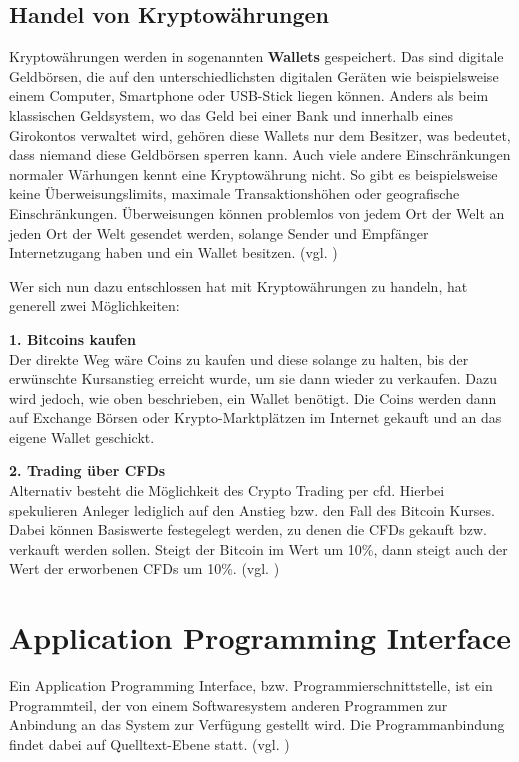 \documentclass[oneside]{ausarbeitung}
\begin{document}
\subsection{Handel von Kryptowährungen}
\label{sub:handel_von_kryptowährungen}

Kryptowährungen werden in sogenannten \textbf{Wallets} gespeichert.
Das sind digitale Geldbörsen, die auf den unterschiedlichsten
digitalen Geräten wie beispielsweise einem Computer, Smartphone oder
USB-Stick liegen können. Anders als beim klassischen Geldsystem, wo
das Geld bei einer Bank und innerhalb eines Girokontos verwaltet wird,
gehören diese Wallets nur dem Besitzer, was bedeutet, dass niemand
diese Geldbörsen sperren kann. Auch viele andere Einschränkungen
normaler Wärhungen kennt eine Kryptowährung nicht. So gibt es
beispielsweise keine Überweisungslimits, maximale Transaktionshöhen
oder geografische Einschränkungen. Überweisungen können problemlos
von jedem Ort der Welt an jeden Ort der Welt gesendet werden, solange
Sender und Empfänger Internetzugang haben und ein Wallet besitzen.
(vgl. \cite{bitcoins_erklärung})

Wer sich nun dazu entschlossen hat mit Kryptowährungen zu handeln,
hat generell zwei Möglichkeiten:

\textbf{1. Bitcoins kaufen} \\
Der direkte Weg wäre Coins zu kaufen und diese solange zu halten, bis
der erwünschte Kursanstieg erreicht wurde, um sie dann wieder zu
verkaufen. Dazu wird jedoch, wie oben beschrieben, ein Wallet
benötigt. Die Coins werden dann auf Exchange Börsen oder
Krypto-Marktplätzen im Internet gekauft und an das eigene Wallet
geschickt.  

\textbf{2. Trading über CFDs} \\
Alternativ besteht die Möglichkeit des Crypto Trading per \ac{cfd}.
Hierbei spekulieren Anleger lediglich auf den Anstieg bzw. den Fall
des Bitcoin Kurses. Dabei können Basiswerte festegelegt werden, zu
denen die CFDs gekauft bzw. verkauft werden sollen. Steigt der Bitcoin
im Wert um 10\%, dann steigt auch der Wert der erworbenen CFDs um
10\%. (vgl. \cite{crypto_trading})


\section{Application Programming Interface}
\label{sec:api}

Ein Application Programming Interface, bzw. Programmierschnittstelle,
ist ein Programmteil, der von einem Softwaresystem anderen Programmen
zur Anbindung an das System zur Verfügung gestellt wird. Die
Programmanbindung findet dabei auf Quelltext-Ebene statt. (vgl.
\cite{api_definition})
\end{document}
